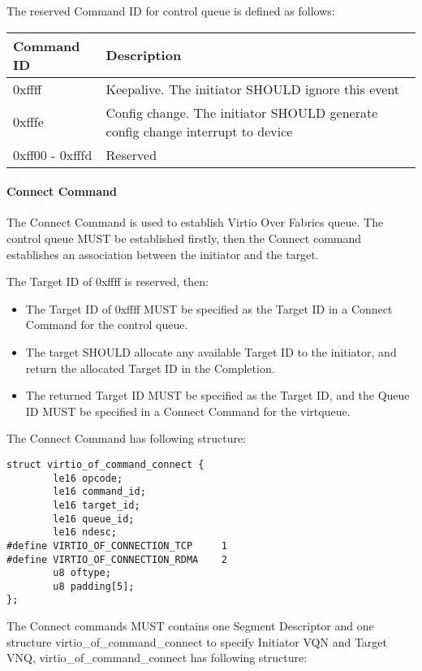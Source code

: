 The reserved Command ID for control queue is defined as follows:

\begin{tabular}{ |l|l| }
\hline
Command ID & Description \\
\hline \hline
0xffff & Keepalive. The initiator SHOULD ignore this event \\
\hline
0xfffe & Config change. The initiator SHOULD generate config change interrupt to device \\
\hline
0xff00 - 0xfffd & Reserved \\
\hline
\end{tabular}

\paragraph{Connect Command}\label{sec:Virtio Transport Options / Virtio Over Fabrics / Transmission Protocol / Commands Definition / Connect Command}
The Connect Command is used to establish Virtio Over Fabrics queue. The control
queue MUST be established firstly, then the Connect command establishes an
association between the initiator and the target.

The Target ID of 0xffff is reserved, then:
\begin{itemize}
\item The Target ID of 0xffff MUST be specified as the Target ID in a Connect
Command for the control queue.
\item The target SHOULD allocate any available Target ID to the initiator,
and return the allocated Target ID in the Completion.
\item The returned Target ID MUST be specified as the Target ID, and the Queue ID
MUST be specified in a Connect Command for the virtqueue.
\end{itemize}

The Connect Command has following structure:

\begin{lstlisting}
struct virtio_of_command_connect {
        le16 opcode;
        le16 command_id;
        le16 target_id;
        le16 queue_id;
        le16 ndesc;
#define VIRTIO_OF_CONNECTION_TCP     1
#define VIRTIO_OF_CONNECTION_RDMA    2
        u8 oftype;
        u8 padding[5];
};
\end{lstlisting}

The Connect commands MUST contains one Segment Descriptor and one structure
virtio_of_command_connect to specify Initiator VQN and Target VNQ,
virtio_of_command_connect has following structure:

